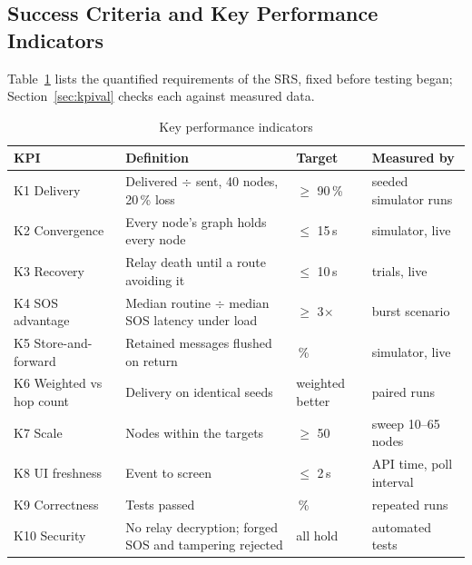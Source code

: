 \subsection{Success Criteria and Key Performance Indicators}
\label{sec:kpi}
Table~\ref{tab:kpi} lists the quantified requirements of the SRS, fixed before testing began; Section~\ref{sec:kpival} checks each against measured data.
\begin{table}[!htbp]
\caption{Key performance indicators}
\label{tab:kpi}
\footnotesize
\begin{tabularx}{\textwidth}{@{}>{\raggedright\arraybackslash}p{3.6cm}>{\raggedright\arraybackslash}X>{\raggedright\arraybackslash}p{1.9cm}>{\raggedright\arraybackslash}p{3.5cm}@{}}
\toprule
\textbf{KPI} & \textbf{Definition} & \textbf{Target} & \textbf{Measured by}\\ \midrule
K1 Delivery & Delivered $\div$ sent, 40 nodes, 20\,\% loss & $\ge$ 90\,\% & seeded simulator runs\\
K2 Convergence & Every node's graph holds every node & $\le$ 15\,s & simulator, live\\
K3 Recovery & Relay death until a route avoiding it & $\le$ 10\,s & 50 trials, live\\
K4 SOS advantage & Median routine $\div$ median SOS latency under load & $\ge$ 3$\times$ & burst scenario\\
K5 Store-and-forward & Retained messages flushed on return & 100\,\% & simulator, live\\
K6 Weighted vs hop count & Delivery on identical seeds & weighted better & paired runs\\
K7 Scale & Nodes within the targets & $\ge$ 50 & sweep 10--65 nodes\\
K8 UI freshness & Event to screen & $\le$ 2\,s & API time, poll interval\\
K9 Correctness & Tests passed & 100\,\% & repeated runs\\
K10 Security & No relay decryption; forged SOS and tampering rejected & all hold & automated tests\\
\bottomrule
\end{tabularx}
\end{table}
